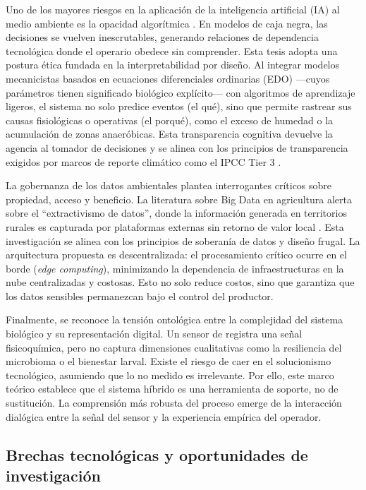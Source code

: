 Uno de los mayores riesgos en la aplicación de la inteligencia artificial (IA) al medio ambiente es la opacidad algorítmica \cite{burrellHowMachineThinks2016}. En modelos de caja negra, las decisiones se vuelven inescrutables, generando relaciones de dependencia tecnológica donde el operario obedece sin comprender. Esta tesis adopta una postura ética fundada en la interpretabilidad por diseño. Al integrar modelos mecanicistas basados en ecuaciones diferenciales ordinarias (EDO) ---cuyos parámetros tienen significado biológico explícito--- con algoritmos de aprendizaje ligeros, el sistema no solo predice eventos (el qué), sino que permite rastrear sus causas fisiológicas o operativas (el porqué), como el exceso de humedad o la acumulación de zonas anaeróbicas. Esta transparencia cognitiva devuelve la agencia al tomador de decisiones y se alinea con los principios de transparencia exigidos por marcos de reporte climático como el IPCC Tier 3 \cite{adadiPeekingBlackBoxSurvey2018}.

La gobernanza de los datos ambientales plantea interrogantes críticos sobre propiedad, acceso y beneficio. La literatura sobre Big Data en agricultura alerta sobre el ``extractivismo de datos'', donde la información generada en territorios rurales es capturada por plataformas externas sin retorno de valor local \cite{carolanAutomatedAgrifoodFutures2020}. Esta investigación se alinea con los principios de soberanía de datos y diseño frugal. La arquitectura propuesta es descentralizada: el procesamiento crítico ocurre en el borde (\textit{edge computing}), minimizando la dependencia de infraestructuras en la nube centralizadas y costosas. Esto no solo reduce costos, sino que garantiza que los datos sensibles permanezcan bajo el control del productor.

Finalmente, se reconoce la tensión ontológica entre la complejidad del sistema biológico y su representación digital. Un sensor de  registra una señal fisicoquímica, pero no captura dimensiones cualitativas como la resiliencia del microbioma o el bienestar larval. Existe el riesgo de caer en el solucionismo tecnológico, asumiendo que lo no medido es irrelevante. Por ello, este marco teórico establece que el sistema híbrido es una herramienta de soporte, no de sustitución. La comprensión más robusta del proceso emerge de la interacción dialógica entre la señal del sensor y la experiencia empírica del operador.

\subsection{Brechas tecnológicas y oportunidades de investigación}


